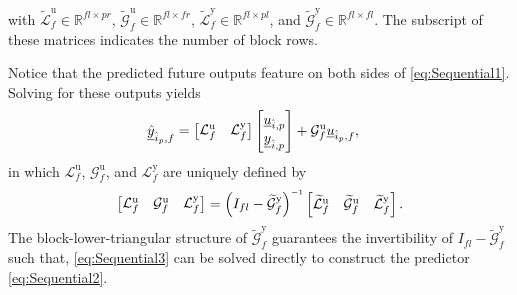 with ${\widetilde{\mathcal{L}}^\mathrm{u}_f\in\mathbb{R}^{fl\times pr}}$, ${\widetilde{\mathcal{G}}^\mathrm{u}_f\in\mathbb{R}^{fl\times fr}}$, ${\widetilde{\mathcal{L}}^\mathrm{y}_f\in\mathbb{R}^{fl\times pl}}$, and ${\widetilde{\mathcal{G}}^\mathrm{y}_f\in\mathbb{R}^{fl\times fl}}$. The subscript of these matrices indicates the number of block rows.

Notice that the predicted future outputs feature on both sides of \eqref{eq:Sequential1}. Solving for these outputs yields
\begin{align}\label{eq:Sequential2}
    \underline{\hat{y}}_{\hat{i}_p,f} &=
    \begin{bmatrix}
        \mathcal{L}^\mathrm{u}_f & \mathcal{L}^\mathrm{y}_f 
    \end{bmatrix}    
    \begin{bmatrix}
        \underline{u}_{\hat{i},p}\\
        \underline{y}_{\hat{i},p}
    \end{bmatrix}+
    \mathcal{G}^\mathrm{u}_f
    \underline{u}_{\hat{i}_p,f},
\end{align}%
in which $\mathcal{L}^\mathrm{u}_f$, $\mathcal{G}^\mathrm{u}_f$, and $\mathcal{L}^\mathrm{y}_f$ are uniquely defined by
\begin{align}\label{eq:Sequential3}
    \begin{bmatrix}
        \mathcal{L}^\mathrm{u}_f & \mathcal{G}^\mathrm{u}_f & \mathcal{L}^\mathrm{y}_f
    \end{bmatrix}=
    \left(I_{fl}-\widetilde{\mathcal{G}}^\mathrm{y}_f\right)\inv
    \begin{bmatrix}
        \widetilde{\mathcal{L}}^\mathrm{u}_f & \widetilde{\mathcal{G}}^\mathrm{u}_f & \widetilde{\mathcal{L}}^\mathrm{y}_f
    \end{bmatrix}.
\end{align}
The block-lower-triangular structure of $\widetilde{\mathcal{G}}^\mathrm{y}_f$ guarantees the invertibility of ${I_{fl}-\widetilde{\mathcal{G}}^\mathrm{y}_f}$ such that, \eqref{eq:Sequential3} can be solved directly %
to construct the predictor \eqref{eq:Sequential2}.

